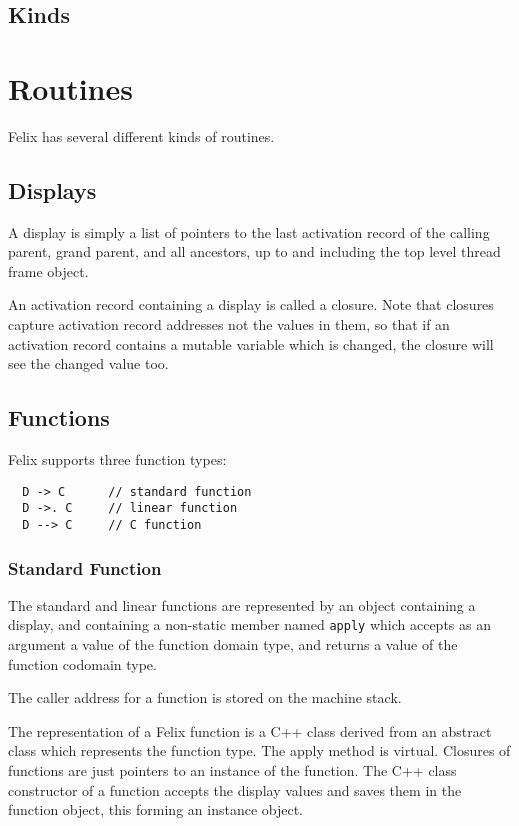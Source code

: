 \documentclass[oneside]{book}
\begin{document}
\section{Kinds}

\chapter{Routines}
Felix has several different kinds of routines.

\section{Displays}
A display is simply a list of pointers to the last activation record of 
the calling parent, grand parent, and all ancestors, up to and including
the top level thread frame object.

An activation record containing a display is called a closure.
Note that closures capture activation record addresses not the
values in them, so that if an activation record contains a mutable
variable which is changed, the closure will see the changed value too.


\section{Functions}
Felix supports three function types:

\begin{verbatim}
  D -> C      // standard function
  D ->. C     // linear function
  D --> C     // C function
\end{verbatim}

\subsection{Standard Function}
The standard and linear functions are represented by an object containing a display,
and containing a non-static member named \verb$apply$ which accepts as an argument
a value of the function domain type, and returns a value of the function codomain type.

The caller address for a function is stored on the machine stack.

The representation of a Felix function is a C++ class derived from an abstract class
which represents the function type. The apply method is virtual. Closures of functions
are just pointers to an instance of the function. The C++ class constructor of a function
accepts the display values and saves them in the function object, this forming
an instance object. 
\end{document}
